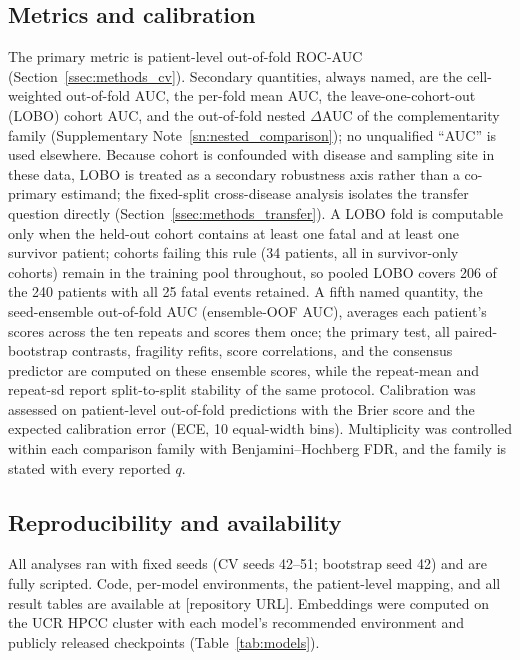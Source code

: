 \subsection{Metrics and calibration}
\label{ssec:methods_metrics}

The primary metric is patient-level out-of-fold ROC-AUC
(Section~\ref{ssec:methods_cv}). Secondary quantities, always named, are the
cell-weighted out-of-fold AUC, the per-fold mean AUC, the leave-one-cohort-out
(LOBO) cohort AUC, and the out-of-fold nested $\Delta$AUC of the
complementarity family (Supplementary Note~\ref{sn:nested_comparison}); no
unqualified ``AUC'' is used elsewhere. Because cohort is
confounded with disease and sampling site in these data, LOBO is treated as a
secondary robustness axis rather than a co-primary estimand; the fixed-split
cross-disease analysis isolates the transfer question directly
(Section~\ref{ssec:methods_transfer}). A LOBO fold is computable only when the
held-out cohort contains at least one fatal and at least one survivor patient;
cohorts failing this rule (34 patients, all in survivor-only cohorts) remain
in the training pool throughout, so pooled LOBO covers 206 of the 240 patients
with all 25 fatal events retained. A fifth named quantity, the
seed-ensemble out-of-fold AUC (ensemble-OOF AUC), averages each patient's
scores across the ten repeats and scores them once; the primary test, all
paired-bootstrap contrasts, fragility refits, score correlations, and the
consensus predictor are computed on these ensemble scores, while the
repeat-mean and repeat-sd report split-to-split stability of the same
protocol.
Calibration was
assessed on patient-level out-of-fold predictions with the Brier score and the
expected calibration error (ECE, 10 equal-width bins). Multiplicity was
controlled within each comparison family with Benjamini--Hochberg FDR, and the
family is stated with every reported $q$.

\subsection{Reproducibility and availability}
\label{ssec:methods_repro}

All analyses ran with fixed seeds (CV seeds 42--51; bootstrap seed 42) and are
fully scripted. Code, per-model environments, the patient-level mapping, and
all result tables are available at [repository URL]. Embeddings were computed
on the UCR HPCC cluster with each model's recommended environment and publicly
released checkpoints (Table~\ref{tab:models}).

